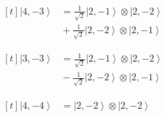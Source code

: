 \documentclass[11pt,a4paper]{article}
\newcommand{\estadocelda}[1]{%
  \begin{minipage}[t]{0.48\linewidth}
  \small\raggedright
  \(\displaystyle\begin{aligned}[t]#1\end{aligned}\)
  \end{minipage}%
}
\newcommand{\ket}[1]{\left|#1\right\rangle}
\begin{document}
\noindent\estadocelda{
\ket{4,-3} &= \frac{1}{\sqrt{2}}\ket{2,-1}\otimes\ket{2,-2} \\
 &{}+\frac{1}{\sqrt{2}}\ket{2,-2}\otimes\ket{2,-1}
}\hfill\estadocelda{
\ket{3,-3} &= \frac{1}{\sqrt{2}}\ket{2,-1}\otimes\ket{2,-2} \\
 &{}-\frac{1}{\sqrt{2}}\ket{2,-2}\otimes\ket{2,-1}
}\par\addvspace{1.4em}

\noindent\estadocelda{
\ket{4,-4} &= \ket{2,-2}\otimes\ket{2,-2}
}\par\addvspace{1.4em}
\end{document}
